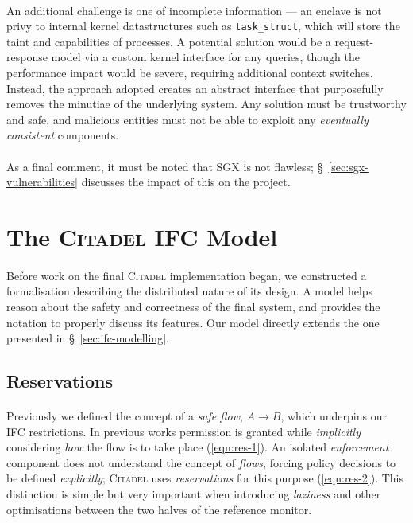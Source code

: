 \paragraph{} An additional challenge is one of incomplete information --- an enclave is not privy to internal kernel datastructures such as \texttt{task\_struct}, which will store the taint and capabilities of processes. A potential solution would be a request-response model via a custom kernel interface for any queries, though the performance impact would be severe, requiring additional context switches. Instead, the approach adopted creates an abstract interface that purposefully removes the minutiae of the underlying system. Any solution must be trustworthy and safe, and malicious entities must not be able to exploit any \textit{eventually consistent} components.~\cite{10.1145/1435417.1435432}

\paragraph{} As a final comment, it must be noted that SGX is not flawless; §~\ref{sec:sgx-vulnerabilities} discusses the impact of this on the project.



\section{The \textsc{Citadel} IFC Model}

\paragraph{} Before work on the final \textsc{Citadel} implementation began, we constructed a formalisation describing the distributed nature of its design. A model helps reason about the safety and correctness of the final system, and provides the notation to properly discuss its features. Our model directly extends the one presented in §~\ref{sec:ifc-modelling}.

\subsection{Reservations}

\paragraph{} Previously we defined the concept of a \textit{safe flow}, $A \rightarrow B$, which underpins our IFC restrictions. In previous works permission is granted while \textit{implicitly} considering \textit{how} the flow is to take place (\ref{eqn:res-1}). An isolated \textit{enforcement} component does not understand the concept of \textit{flows}, forcing policy decisions to be defined \textit{explicitly}; \textsc{Citadel} uses \textit{reservations} for this purpose (\ref{eqn:res-2}). This distinction is simple but very important when introducing \textit{laziness} and other optimisations between the two halves of the reference monitor.

